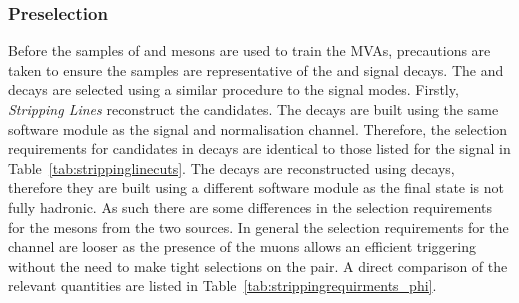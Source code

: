 \subsubsection{Preselection}

Before the samples of \Dsp and \phiz mesons are used to train the MVAs, precautions are taken to ensure the samples are representative of the \decay{\Bp}{\Dsp\phiz} and \decay{\Bp}{\Dsp\Kp\Km} signal decays. The \decay{\Bsb}{\Dsp\pim} and \decay{\Bs}{\jpsi\phiz} decays are selected using a similar procedure to the signal modes. Firstly, \emph{Stripping Lines} reconstruct the candidates. The \decay{\Bsb}{\Dsp\pim} decays are built using the same software module as the signal and normalisation channel. Therefore, the selection requirements for \Dsp candidates in \decay{\Bsb}{\Dsp\pim} decays are identical to those listed for the signal in Table~\ref{tab:strippinglinecuts}.
The \decay{\Bs}{\jpsi\phiz} decays are reconstructed using \decay{\jpsi}{\mup\mun} decays, therefore they are built using a different software module as the final state is not fully hadronic. As such there are some differences in the selection requirements for the \phiz mesons from the two sources. In general the selection requirements for the \decay{\Bs}{\jpsi\phiz} channel are looser as the presence of the muons allows an efficient triggering without the need to make tight selections on the \Kp\Km pair. A direct comparison of the relevant quantities are listed in Table~\ref{tab:strippingrequirments_phi}.



